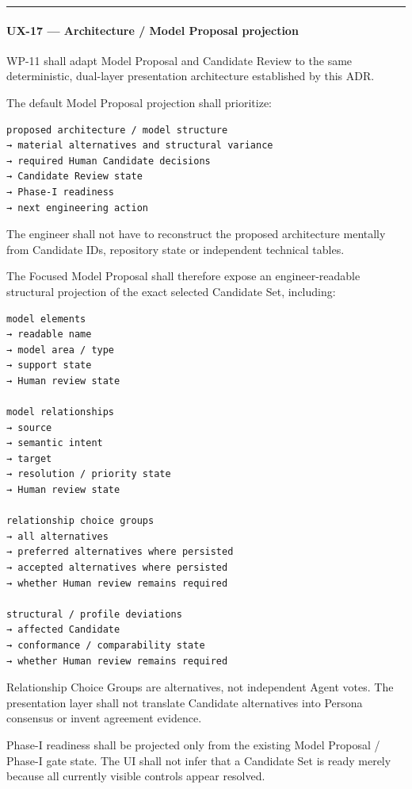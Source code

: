 \begin{center}\rule{0.5\linewidth}{0.5pt}\end{center}

\hypertarget{ux-17--architecture--model-proposal-projection}{%
\paragraph{UX-17 --- Architecture / Model Proposal projection}\label{ux-17--architecture--model-proposal-projection}}

WP-11 shall adapt Model Proposal and Candidate Review to the same deterministic, dual-layer presentation architecture established by this ADR.

The default Model Proposal projection shall prioritize:

\begin{verbatim}
proposed architecture / model structure
→ material alternatives and structural variance
→ required Human Candidate decisions
→ Candidate Review state
→ Phase-I readiness
→ next engineering action
\end{verbatim}

The engineer shall not have to reconstruct the proposed architecture mentally from Candidate IDs, repository state or independent technical tables.

The Focused Model Proposal shall therefore expose an engineer-readable structural projection of the exact selected Candidate Set, including:

\begin{verbatim}
model elements
→ readable name
→ model area / type
→ support state
→ Human review state

model relationships
→ source
→ semantic intent
→ target
→ resolution / priority state
→ Human review state

relationship choice groups
→ all alternatives
→ preferred alternatives where persisted
→ accepted alternatives where persisted
→ whether Human review remains required

structural / profile deviations
→ affected Candidate
→ conformance / comparability state
→ whether Human review remains required
\end{verbatim}

Relationship Choice Groups are alternatives, not independent Agent votes. The presentation layer shall not translate Candidate alternatives into Persona consensus or invent agreement evidence.

Phase-I readiness shall be projected only from the existing Model Proposal / Phase-I gate state. The UI shall not infer that a Candidate Set is ready merely because all currently visible controls appear resolved.

